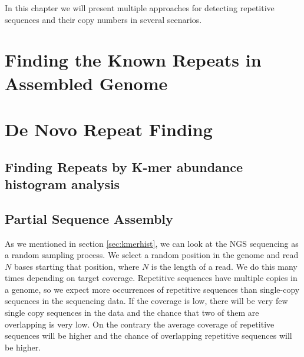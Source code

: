 In this chapter we will present multiple approaches for detecting repetitive sequences and their copy numbers in several scenarios.


\section{Finding the Known Repeats in Assembled Genome}


\section{De Novo Repeat Finding}


\subsection{Finding Repeats by K-mer abundance histogram analysis}


\subsection{Partial Sequence Assembly}

As we mentioned in section \ref{sec:kmerhist}, we can look at the NGS sequencing as a random sampling process. We select a random position in the genome and read $N$ bases starting that position, where $N$ is the length of a read. We do this many times depending on target coverage.
Repetitive sequences have multiple copies in a genome, so we expect more occurrences of repetitive sequences than single-copy sequences in the sequencing data. If the coverage is low, there will be very few single copy sequences in the data and the chance that two of them are overlapping is very low. On the contrary the average coverage of repetitive sequences will be higher and the chance of overlapping repetitive sequences will be higher.

